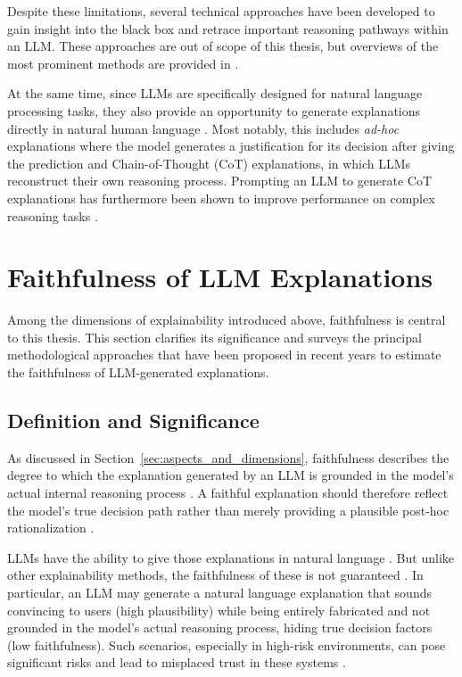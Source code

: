 Despite these limitations, several technical approaches have been developed to gain insight into the black box and retrace important reasoning pathways within an LLM. These approaches are out of scope of this thesis, but overviews of the most prominent methods are provided in \cite{zhaoExplainabilityLargeLanguage2024, luoUnderstandingUtilizationSurvey2024}.

At the same time, since LLMs are specifically designed for natural language processing tasks, they also provide an opportunity to generate explanations directly in natural human language \cite{zhaoExplainabilityLargeLanguage2024}. Most notably, this includes \emph{ad-hoc} explanations where the model generates a justification for its decision after giving the prediction and Chain-of-Thought (CoT) explanations, in which LLMs reconstruct their own reasoning process. Prompting an LLM to generate CoT explanations has furthermore been shown to improve performance on complex reasoning tasks \cite{weiChainofthoughtPromptingElicits2022}.

\section{Faithfulness of LLM Explanations}
Among the dimensions of explainability introduced above, faithfulness is central to this thesis. This section clarifies its significance and surveys the principal methodological approaches that have been proposed in recent years to estimate the faithfulness of LLM-generated explanations.

\subsection{Definition and Significance}
\label{sec:definition_faithfulness}
As discussed in Section~\ref{sec:aspects_and_dimensions}, faithfulness describes the degree to which the explanation generated by an LLM is grounded in the model's actual internal reasoning process \cite{herreraMakingSenseUnsensible2025, jacoviFaithfullyInterpretableNLP2020, ribeiroWhyShouldTrust2016}. A faithful explanation should therefore reflect the model's true decision path rather than merely providing a plausible post-hoc rationalization \cite{herreraMakingSenseUnsensible2025}.

LLMs have the ability to give those explanations in natural language \cite{weiChainofthoughtPromptingElicits2022}. But unlike other explainability methods, the faithfulness of these is not guaranteed  \cite{herreraMakingSenseUnsensible2025, jacoviFaithfullyInterpretableNLP2020}. In particular, an LLM may generate a natural language explanation that sounds convincing to users (high plausibility) while being entirely fabricated and not grounded in the model's actual reasoning process, hiding true decision factors (low faithfulness). Such scenarios, especially in high-risk environments, can pose significant risks and lead to misplaced trust in these systems \cite{agarwalFaithfulnessVsPlausibility2024, madsenAreSelfexplanationsLarge2024, herreraMakingSenseUnsensible2025}.

